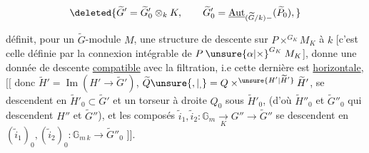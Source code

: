 \[
\deleted{\widetilde G'=\widetilde G'_0\otimes_k K,\qquad
\widetilde G'_0=\underline{\operatorname{Aut}}_{(\widetilde G/k)-}(\widetilde P_0),}
\]

  définit, pour un $\widetilde G$-module $M$, une structure de descente sur $P\mathbin{\times}^{G_K}M_K$ à $k$\unsure{,|;} [c'est celle définie par la connexion intégrable de $P\mathbin{\unsure{\alpha|\times}}^{G_K}M_K$], donne une donnée de descente \uline{compatible} avec la filtration, i.e cette dernière est \uline{horizontale}, $\bigl[\!\bigl[$ donc  $\widetilde H'=\operatorname{Im}(H'\longrightarrow\widetilde G')$, $\widetilde Q\unsure{,|_{,}}=Q\mathbin{\times}^{\unsure{H'|\widetilde H'}}\widetilde H'$, se descendent  en $\widetilde H'_0\subset\widetilde G'$ et un torseur à droite $Q_0$ sous $\widetilde H'_0$,  (d'où $\widetilde H''_0$ et $\widetilde G''_0$ qui descendent $H''$ et $\widetilde G''$), et  les composés $\tilde i_1,\tilde i_2:\mathbb G_m\underset K{\longrightarrow}G''\longrightarrow\widetilde G''$ se descendent en $(\tilde i_1)_0,(\tilde i_2)_0:\mathbb G_{m\,k}\longrightarrow\widetilde G''_0$ $\bigr]\!\bigr]$.
